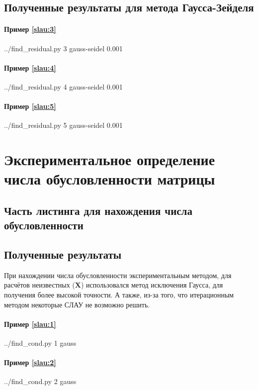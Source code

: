 \documentclass[a4paper]{article}
\newcommand{\m}[1]{\ensuremath{\bm{#1}}}
\begin{document}
\subsection{Полученные результаты для метода Гаусса-Зейделя}

\paragraph{Пример \eqref{slau:3}}
\bash[stdout]
../find_residual.py 3 gauss-seidel 0.001
\END

\paragraph{Пример \eqref{slau:4}}
\bash[stdout]
../find_residual.py 4 gauss-seidel 0.001
\END

\paragraph{Пример \eqref{slau:5}}
\bash[stdout]
../find_residual.py 5 gauss-seidel 0.001
\END

\section{Экспериментальное определение числа обусловленности матрицы}

\subsection{Часть листинга для нахождения числа обусловленности}


\subsection{Полученные результаты}

При нахождении числа обусловленности экспериментальным методом, для расчётов неизвестных ($\m{X}$) использовался метод исключения Гаусса, для получения более высокой точности. А также, из-за того, что итерационным методом некоторые СЛАУ не возможно решить.

\paragraph{Пример \eqref{slau:1}}
\bash[stdout]
../find_cond.py 1 gauss
\END

\paragraph{Пример \eqref{slau:2}}
\bash[stdout]
../find_cond.py 2 gauss
\END
\end{document}
